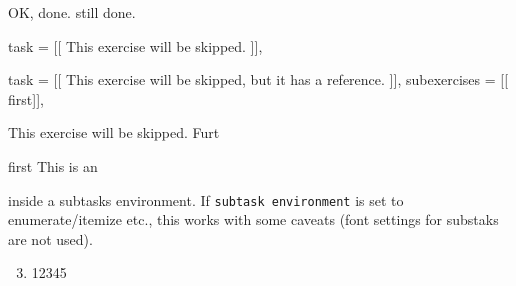 \ifbeamer{\documentclass{beamer}}{\documentclass[a5paper]{article}}
\begin{document}
\begin{sheet}[date={Novanuar 28, -2022},title={Third Sheet},
  number within sheet]
  \begin{exercise}[points={many, many},
    firstline={Read the manual.}]
    \begin{solution}
      OK, done.
      \newpage
      still done.
    \end{solution}
  \end{exercise}
\end{sheet}

\endgroup

\begin{sheet}
  \begin{Lexercise}
    task  = [[
      This exercise will be skipped.
    ]],
  \end{Lexercise}
  \begin{Lexercise}
    task  = [[
      \label{ex:skiplex}%
      This exercise will be skipped, but it has a reference.
    ]],
    subexercises = {[[\label{subex:skiplexOne} first]]},
  \end{Lexercise}
  \begin{exercise}[points={many, many},%
    main task font={\tiny},subtask font={\itshape}
  ]
    \begin{maintask}
      \label{ex:skipex} This exercise will be skipped.
      Furt
    \end{maintask}
    \begin{subtasks}
      \item {first \label{subex:skipexOneOne}} This is an \string\item\space inside a subtasks environment. If
      \verb|subtask environment| is set to enumerate/itemize etc.,
      this works with some caveats (font settings for substaks are not used).
    \end{subtasks}
    \begin{enumerate}
      \setcounter{enumi}{2}
      This is a \string\subtask{} without the susbtasks
      environment, which is unsupported and a bad example!
      \item {\label{subex:skipexTwo}} {12345}
    \end{enumerate}
  \end{exercise}
\end{sheet}
\end{document}
